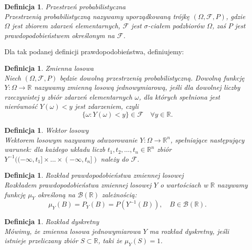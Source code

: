 \documentclass[12pt,a4paper]{report}
\newtheorem{definition}[theorem]{Definicja}
\begin{document}
\begin{definition}{Przestrzeń probabilistyczna \cite[w oparciu o rozdział 1.2]{krysicki1999}}\\
Przestrzenią probabilistyczną nazywamy uporządkowaną trójkę $(\Omega, \mathcal{F}, P)$, gdzie $\Omega$ jest zbiorem zdarzeń elementarnych, $\mathcal{F}$ jest $\sigma$-ciałem podzbiorów $\Omega$, zaś $P$ jest prawdopodobieństwem określonym na $\mathcal{F}$.
\end{definition}

Dla tak podanej definicji prawdopodobieństwa, definiujemy:

\begin{definition}{Zmienna losowa \cite[Rozdział 2.1]{krysicki1999}}\\
Niech $(\Omega, \mathcal{F}, P)$ będzie dowolną przestrzenią probabilistyczną. Dowolną funkcję $\textit{Y} : \Omega \rightarrow \mathbb{R}$ nazywamy zmienną losową jednowymiarową, jeśli dla dowolnej liczby rzeczywistej $y$ zbiór zdarzeń elementarnych $\omega$, dla których spełniona jest nierówność $Y(\omega)< y$ jest zdarzeniem, czyli 
$$\{\omega: Y(\omega) < y \} \in \mathcal{F}\quad \forall y \in \mathbb{R}.$$

\end{definition}


\begin{definition}{Wektor losowy \cite[Rozdział 5.1]{jakubowski2004}}\\
Wektorem losowym nazywamy odwzorowanie $Y:\Omega \rightarrow \mathbb{R}^n$, spełniające następujący warunek: dla każdego układu liczb $t_1,t_2,\ldots,t_n \in \mathbb{R}^n$ zbiór $Y^{-1}((-\infty,t_1]\times \ldots \times(-\infty,t_n])$ należy do $\mathcal{F}$.
\end{definition}


\begin{definition}{Rozkład prawdopodobieństwa zmiennej losowej \cite[Rozdział 5.1]{jakubowski2004}}\\
Rozkładem prawdopodobieństwa zmiennej losowej $Y$ o wartościach w $\mathbb{R}$ nazywamy funkcję $\mu_Y$ określoną na $\mathcal{B}(\mathbb{R})$ zależnością:
$$\mu_Y(B)=P_Y(B)=P(Y^{-1}(B)), \quad B \in \mathcal{B}(\mathbb{R}).$$
 
\end{definition}


\begin{definition}{Rozkład dyskretny \cite[Rozdział 5.1]{jakubowski2004}}\\
Mówimy, że zmienna losowa jednowymiarowa $Y$ ma rozkład dyskretny, jeśli istnieje przeliczany zbiór $S \subset \mathbb{R}$, taki że $\mu_Y(S)=1$.
\end{definition}
\end{document}
